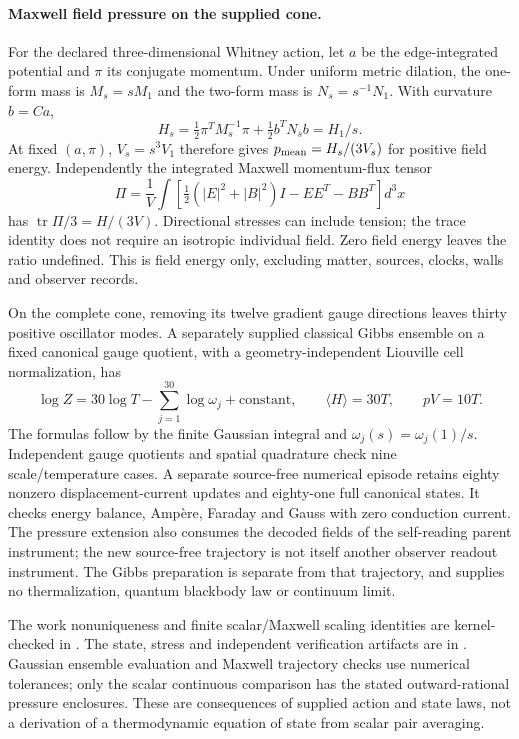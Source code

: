\paragraph{Maxwell field pressure on the supplied cone.}
For the declared three-dimensional Whitney action, let $a$ be the
edge-integrated potential and $\pi$ its conjugate momentum. Under uniform
metric dilation, the one-form mass is $M_s=sM_1$ and the two-form mass is
$N_s=s^{-1}N_1$. With curvature $b=Ca$,
\[
 H_s=\tfrac12\pi^TM_s^{-1}\pi+\tfrac12b^TN_sb=H_1/s.
\]
At fixed $(a,\pi)$, $V_s=s^3V_1$ therefore gives
$p_{\rm mean}=H_s/(3V_s)$ for positive field energy. Independently the
integrated Maxwell momentum-flux tensor
\[
 \Pi=\frac1V\int\left[
 \tfrac12(|E|^2+|B|^2)I-EE^T-BB^T\right]d^3x
\]
has $\operatorname{tr}\Pi/3=H/(3V)$. Directional stresses can include
tension; the trace identity does not require an isotropic individual field.
Zero field energy leaves the ratio undefined. This is field energy only,
excluding matter, sources, clocks, walls and observer records.

On the complete cone, removing its twelve gradient gauge directions
leaves thirty positive oscillator modes. A separately supplied classical
Gibbs ensemble on a fixed canonical gauge quotient, with a geometry-independent
Liouville cell normalization, has
\[
 \log Z=30\log T-\sum_{j=1}^{30}\log\omega_j+\text{constant},
 \qquad \langle H\rangle=30T,\qquad pV=10T.
\]
The formulas follow by the finite Gaussian integral and
$\omega_j(s)=\omega_j(1)/s$. Independent gauge quotients and spatial
quadrature check nine scale/temperature cases. A separate source-free
numerical episode retains eighty nonzero displacement-current updates and
eighty-one full canonical states. It checks energy balance, Amp\`ere,
Faraday and Gauss with zero conduction current. The pressure extension also
consumes the decoded fields of the self-reading parent instrument; the new
source-free trajectory is not itself another observer readout instrument.
The Gibbs preparation is separate from that trajectory, and supplies no
thermalization, quantum blackbody law or continuum limit.

The work nonuniqueness and finite scalar/Maxwell scaling identities are
kernel-checked in .
The state, stress and independent verification artifacts are in
. Gaussian ensemble evaluation and Maxwell
trajectory checks use numerical tolerances; only the scalar continuous
comparison has the stated outward-rational pressure enclosures.
These are consequences of supplied action and state laws, not a derivation
of a thermodynamic equation of state from scalar pair averaging.
